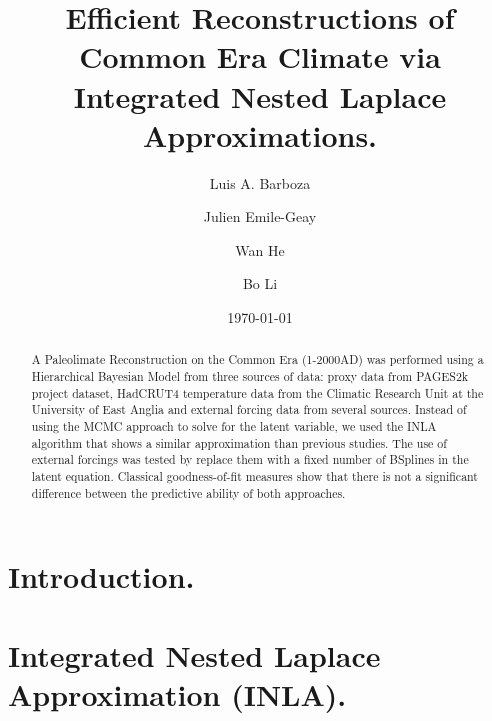 \documentclass[11pt]{amsart}
\theoremstyle{plain}
\theoremstyle{definition}
\theoremstyle{remark}
\begin{document}
\title[Paleoclimate Reconstruction using INLA.]{Efficient Reconstructions of Common Era Climate via Integrated Nested Laplace Approximations.}

\author{Luis A. Barboza}
\address{Centro de Investigacion en Matematica Pura y Aplicada (CIMPA)-Escuela
  de Matematica, Universidad de Costa Rica\\
San Jos\'e, Costa Rica}


\author{Julien Emile-Geay}
\address{Department of Earth Sciences \\
  University of Southern California \\
  Los Angeles, California, USA.
}

\author{Wan He}

\author{Bo Li}
\address{Department of Statistics \\
  University of Illinois at Urbana-Champaign \\
  Champaign, Illinois, USA.
}



\date{\today}
\subjclass[2010]{}
\maketitle

\begin{abstract}
A Paleolimate Reconstruction on the Common Era (1-2000AD) was performed using a
Hierarchical Bayesian Model from three sources of data: proxy data from PAGES2k
project dataset, HadCRUT4 temperature data from the Climatic Research Unit
at the University of East Anglia and external forcing data from several sources.
Instead of using the MCMC approach to solve for the latent variable, we used the
INLA algorithm that shows a similar approximation than previous studies. The use
of external forcings was tested by replace them with a fixed number of
BSplines in the latent equation. Classical goodness-of-fit measures show that there is not a significant
difference between the predictive ability of both approaches. 
\end{abstract}

\section{Introduction.}
\label{sec:intro}

\section{Integrated Nested Laplace Approximation (INLA).}
\label{sec:inla}
\end{document}
